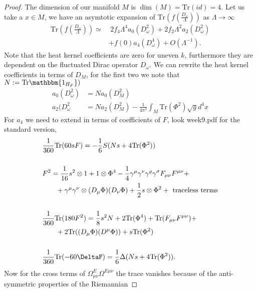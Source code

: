 \documentclass[a4paper]{article}
\theoremstyle{definition}
\theoremstyle{definition}
\theoremstyle{definition}
\theoremstyle{theorem}
\theoremstyle{theorem}
\theoremstyle{theorem}
\begin{document}
\begin{proof}
     The dimension of our manifold $M$ is $\dim(M) = \text{Tr}(id) =4 $. Let us
     take a $x \in M$, we have an asymtotic expansion of
     $\text{Tr}(f(\frac{D_\omega}{\Lambda}))$ as $\Lambda \rightarrow \infty$
     \begin{align}
         \text{Tr}(f(\frac{D_\omega}{\Lambda})) \simeq& \ 2f_4 \Lambda ^4
         a_0(D_\omega ^2)+ 2f_2\Lambda^2 a_2(D_\omega^2) \\&+ f(0) a_4(D_\omega^4)
         +O(\Lambda^{-1}).
     \end{align}
     Note that the heat kernel coefficients are zero for uneven $k$,
     furthermore they are dependent on the fluctuated Dirac operator
     $D_\omega$. We can rewrite the heat kernel coefficients in terms of $D_M$,
     for the first two we note that $N:= \text{Tr}\mathbbm{1_{H_F}})$
     \begin{align}
         a_0(D_\omega^2) &= Na_0(D_M^2)\\
         a_2(D_\omega^2 &= Na_2(D_M^2) - \frac{1}{4\pi^2}\int_M
         \text{Tr}(\Phi^2)\sqrt{g}d^4x
     \end{align}
     For $a_4$ we need to extend in terms of coefficients of $F$, look week9.pdf
     for the standard version,
     \begin{align}
         &\frac{1}{360}\text{Tr}(60sF)= -\frac{1}{6}S(Ns + 4
         \text{Tr}(\Phi^2))\\
        \nonumber\\
         &F^2 = \frac{1}{16}s^2\otimes 1 + 1\otimes \Phi^4 - \frac{1}{4}
         \gamma^\mu\gamma^\nu \gamma^\varrho\gamma^\sigma F_{\mu\nu}F^{\mu\nu}+\\
         &\;\;\;\;\;\;\;+\gamma^\mu\gamma^\nu\otimes(D_\mu\Phi)(D_\nu
         \Phi)+\frac{1}{2}s\otimes \Phi^2 + \ \text{traceless terms}\\
         \nonumber\\
         &\frac{1}{360}\text{Tr}(180F^2) = \frac{1}{8}s^2N + 2\text{Tr}(\Phi^4)
         + \text{Tr}(F_{\mu\nu}F^{\mu\nu}) +\\
         &\;\;\;\;\;\;\;+2\text{Tr}((D_\mu\Phi)(D^\mu\Phi))
         + s\text{Tr}(\Phi^2)\\
         \nonumber\\
         &\frac{1}{360}\text{Tr}(-60\DeltaF)=
         \frac{1}{6}\Delta(Ns+4\text{Tr}(\Phi^2)).
     \end{align}
     Now for the cross terms of $\Omega_{\mu\nu}^E\Omega^{E\mu\nu}$  the trace
     vanishes because of the anti-symmetric properties of the Riemannian

\end{proof}
\end{document}
